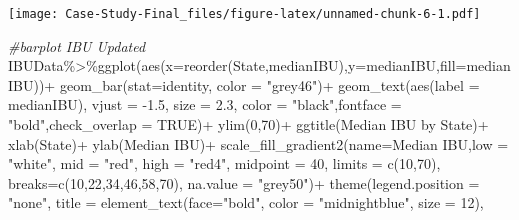\documentclass[
]{article}
\newenvironment{Shaded}{\begin{snugshade}}{\end{snugshade}}
\newcommand{\AttributeTok}[1]{\textcolor[rgb]{0.77,0.63,0.00}{#1}}
\newcommand{\CommentTok}[1]{\textcolor[rgb]{0.56,0.35,0.01}{\textit{#1}}}
\newcommand{\ConstantTok}[1]{\textcolor[rgb]{0.00,0.00,0.00}{#1}}
\newcommand{\DecValTok}[1]{\textcolor[rgb]{0.00,0.00,0.81}{#1}}
\newcommand{\FloatTok}[1]{\textcolor[rgb]{0.00,0.00,0.81}{#1}}
\newcommand{\FunctionTok}[1]{\textcolor[rgb]{0.00,0.00,0.00}{#1}}
\newcommand{\NormalTok}[1]{#1}
\newcommand{\SpecialCharTok}[1]{\textcolor[rgb]{0.00,0.00,0.00}{#1}}
\newcommand{\StringTok}[1]{\textcolor[rgb]{0.31,0.60,0.02}{#1}}
\begin{document}
\texttt{[image: Case-Study-Final\_files/figure-latex/unnamed-chunk-6-1.pdf]}

\begin{Shaded}
\begin{Highlighting}[]
\CommentTok{\#barplot IBU Updated}
\NormalTok{IBUData}\SpecialCharTok{\%\textgreater{}\%}\FunctionTok{ggplot}\NormalTok{(}\FunctionTok{aes}\NormalTok{(}\AttributeTok{x=}\FunctionTok{reorder}\NormalTok{(State,medianIBU),}\AttributeTok{y=}\NormalTok{medianIBU,}\AttributeTok{fill=}\NormalTok{medianIBU))}\SpecialCharTok{+}
  \FunctionTok{geom\_bar}\NormalTok{(}\AttributeTok{stat=}\StringTok{\textquotesingle{}identity\textquotesingle{}}\NormalTok{, }\AttributeTok{color =} \StringTok{"grey46"}\NormalTok{)}\SpecialCharTok{+}
  \FunctionTok{geom\_text}\NormalTok{(}\FunctionTok{aes}\NormalTok{(}\AttributeTok{label  =}\NormalTok{ medianIBU), }\AttributeTok{vjust =} \SpecialCharTok{{-}}\FloatTok{1.5}\NormalTok{, }\AttributeTok{size =} \FloatTok{2.3}\NormalTok{, }\AttributeTok{color =} \StringTok{"black"}\NormalTok{,}\AttributeTok{fontface =}  \StringTok{"bold"}\NormalTok{,}\AttributeTok{check\_overlap =} \ConstantTok{TRUE}\NormalTok{)}\SpecialCharTok{+}
  \FunctionTok{ylim}\NormalTok{(}\DecValTok{0}\NormalTok{,}\DecValTok{70}\NormalTok{)}\SpecialCharTok{+}
  \FunctionTok{ggtitle}\NormalTok{(}\StringTok{\textquotesingle{}Median IBU by State\textquotesingle{}}\NormalTok{)}\SpecialCharTok{+}
  \FunctionTok{xlab}\NormalTok{(}\StringTok{\textquotesingle{}State\textquotesingle{}}\NormalTok{)}\SpecialCharTok{+}
  \FunctionTok{ylab}\NormalTok{(}\StringTok{\textquotesingle{}Median IBU\textquotesingle{}}\NormalTok{)}\SpecialCharTok{+}
  \FunctionTok{scale\_fill\_gradient2}\NormalTok{(}\AttributeTok{name=}\StringTok{\textquotesingle{}Median IBU\textquotesingle{}}\NormalTok{,}\AttributeTok{low =} \StringTok{"white"}\NormalTok{, }\AttributeTok{mid =} \StringTok{"red"}\NormalTok{, }\AttributeTok{high =} \StringTok{"red4"}\NormalTok{, }
                       \AttributeTok{midpoint =} \DecValTok{40}\NormalTok{, }\AttributeTok{limits =} \FunctionTok{c}\NormalTok{(}\DecValTok{10}\NormalTok{,}\DecValTok{70}\NormalTok{), }
                       \AttributeTok{breaks=}\FunctionTok{c}\NormalTok{(}\DecValTok{10}\NormalTok{,}\DecValTok{22}\NormalTok{,}\DecValTok{34}\NormalTok{,}\DecValTok{46}\NormalTok{,}\DecValTok{58}\NormalTok{,}\DecValTok{70}\NormalTok{), }\AttributeTok{na.value =} \StringTok{"grey50"}\NormalTok{)}\SpecialCharTok{+}
  \FunctionTok{theme}\NormalTok{(}\AttributeTok{legend.position =} \StringTok{"none"}\NormalTok{,}
        \AttributeTok{title =} \FunctionTok{element\_text}\NormalTok{(}\AttributeTok{face=}\StringTok{"bold"}\NormalTok{, }\AttributeTok{color =} \StringTok{"midnightblue"}\NormalTok{, }\AttributeTok{size =} \DecValTok{12}\NormalTok{),}

\end{Highlighting}
\end{Shaded}
\end{document}
